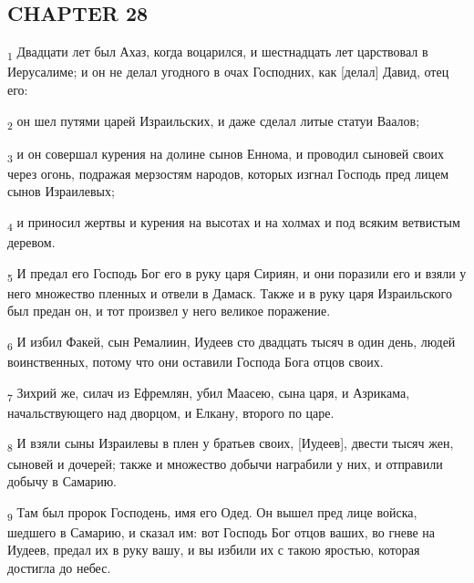\subsection{CHAPTER 28}
\begin{tcolorbox}
\textsubscript{1} Двадцати лет был Ахаз, когда воцарился, и шестнадцать лет царствовал в Иерусалиме; и он не делал угодного в очах Господних, как [делал] Давид, отец его:
\end{tcolorbox}
\begin{tcolorbox}
\textsubscript{2} он шел путями царей Израильских, и даже сделал литые статуи Ваалов;
\end{tcolorbox}
\begin{tcolorbox}
\textsubscript{3} и он совершал курения на долине сынов Еннома, и проводил сыновей своих через огонь, подражая мерзостям народов, которых изгнал Господь пред лицем сынов Израилевых;
\end{tcolorbox}
\begin{tcolorbox}
\textsubscript{4} и приносил жертвы и курения на высотах и на холмах и под всяким ветвистым деревом.
\end{tcolorbox}
\begin{tcolorbox}
\textsubscript{5} И предал его Господь Бог его в руку царя Сириян, и они поразили его и взяли у него множество пленных и отвели в Дамаск. Также и в руку царя Израильского был предан он, и тот произвел у него великое поражение.
\end{tcolorbox}
\begin{tcolorbox}
\textsubscript{6} И избил Факей, сын Ремалиин, Иудеев сто двадцать тысяч в один день, людей воинственных, потому что они оставили Господа Бога отцов своих.
\end{tcolorbox}
\begin{tcolorbox}
\textsubscript{7} Зихрий же, силач из Ефремлян, убил Маасею, сына царя, и Азрикама, начальствующего над дворцом, и Елкану, второго по царе.
\end{tcolorbox}
\begin{tcolorbox}
\textsubscript{8} И взяли сыны Израилевы в плен у братьев своих, [Иудеев], двести тысяч жен, сыновей и дочерей; также и множество добычи награбили у них, и отправили добычу в Самарию.
\end{tcolorbox}
\begin{tcolorbox}
\textsubscript{9} Там был пророк Господень, имя его Одед. Он вышел пред лице войска, шедшего в Самарию, и сказал им: вот Господь Бог отцов ваших, во гневе на Иудеев, предал их в руку вашу, и вы избили их с такою яростью, которая достигла до небес.
\end{tcolorbox}
